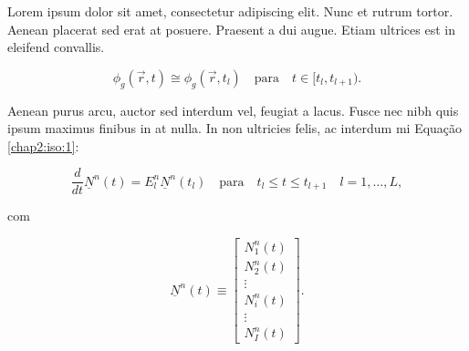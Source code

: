 Lorem ipsum dolor sit amet, consectetur adipiscing elit. Nunc et rutrum tortor. Aenean placerat sed erat at posuere. Praesent a dui augue. Etiam ultrices est in eleifend convallis.

\begin{equation}
    \phi_g(\vec{r},t) \cong \phi_g(\vec{r},t_l) \quad \text{para} \quad t \in [t_l,t_{l+1}).
\end{equation}

Aenean purus arcu, auctor sed interdum vel, feugiat a lacus. Fusce nec nibh quis ipsum maximus finibus in at nulla. In non ultricies felis, ac interdum mi Equação \ref{chap2:iso:1}: 

\begin{equation}
    \frac{d}{dt}\underline{N}^n(t) = E_l^n \underline{N}^n(t_l) \quad \text{para} \quad t_l \leq t \leq t_{l+1} \quad l =1,\ldots,L,
    \label{chap2:iso:1}
\end{equation}

\noindent{}com 

\begin{equation*}
    \underline{N}^n(t) \equiv 
    \begin{bmatrix}
    N_1^n(t) \\
    N_2^n(t) \\
    \vdots \\
    N_i^n(t) \\
    \vdots \\
    N_I^n(t)
    \end{bmatrix}.
\end{equation*}